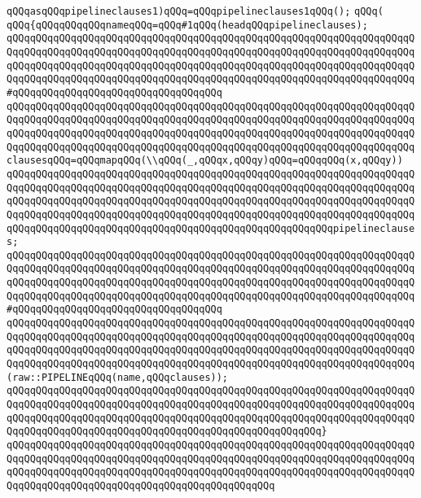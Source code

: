 \verb|qQQqasqQQqpipelineclauses1)qQQq=qQQqpipelineclauses1qQQq();|\newline
\verb|qQQq(|\newline
\verb|qQQq{qQQqqQQqqQQqnameqQQq=qQQq#1qQQq(headqQQqpipelineclauses);|\newline
\verb|qQQqqQQqqQQqqQQqqQQqqQQqqQQqqQQqqQQqqQQqqQQqqQQqqQQqqQQqqQQqqQQqqQQqqQQqqQQqqQQqqQQqqQQqqQQqqQQqqQQqqQQqqQQqqQQqqQQqqQQqqQQqqQQqqQQqqQQqqQQqqQQqqQQqqQQqqQQqqQQqqQQqqQQqqQQqqQQqqQQqqQQqqQQqqQQqqQQqqQQqqQQqqQQqqQQqqQQqqQQqqQQqqQQqqQQqqQQqqQQqqQQqqQQqqQQqqQQqqQQqqQQqqQQqqQQqqQQqqQQq#qQQqqQQqqQQqqQQqqQQqqQQqqQQqqQQqqQQq|\newline
\verb|qQQqqQQqqQQqqQQqqQQqqQQqqQQqqQQqqQQqqQQqqQQqqQQqqQQqqQQqqQQqqQQqqQQqqQQqqQQqqQQqqQQqqQQqqQQqqQQqqQQqqQQqqQQqqQQqqQQqqQQqqQQqqQQqqQQqqQQqqQQqqQQqqQQqqQQqqQQqqQQqqQQqqQQqqQQqqQQqqQQqqQQqqQQqqQQqqQQqqQQqqQQqqQQqqQQqqQQqqQQqqQQqqQQqqQQqqQQqqQQqqQQqqQQqqQQqqQQqqQQqqQQqqQQqqQQqqQQqqQQqclausesqQQq=qQQqmapqQQq(\\qQQq(_,qQQqx,qQQqy)qQQq=qQQqqQQq(x,qQQqy))|\newline
\verb|qQQqqQQqqQQqqQQqqQQqqQQqqQQqqQQqqQQqqQQqqQQqqQQqqQQqqQQqqQQqqQQqqQQqqQQqqQQqqQQqqQQqqQQqqQQqqQQqqQQqqQQqqQQqqQQqqQQqqQQqqQQqqQQqqQQqqQQqqQQqqQQqqQQqqQQqqQQqqQQqqQQqqQQqqQQqqQQqqQQqqQQqqQQqqQQqqQQqqQQqqQQqqQQqqQQqqQQqqQQqqQQqqQQqqQQqqQQqqQQqqQQqqQQqqQQqqQQqqQQqqQQqqQQqqQQqqQQqqQQqqQQqqQQqqQQqqQQqqQQqqQQqqQQqqQQqqQQqqQQqqQQqqQQqqQQqqQQqpipelineclauses;|\newline
\verb|qQQqqQQqqQQqqQQqqQQqqQQqqQQqqQQqqQQqqQQqqQQqqQQqqQQqqQQqqQQqqQQqqQQqqQQqqQQqqQQqqQQqqQQqqQQqqQQqqQQqqQQqqQQqqQQqqQQqqQQqqQQqqQQqqQQqqQQqqQQqqQQqqQQqqQQqqQQqqQQqqQQqqQQqqQQqqQQqqQQqqQQqqQQqqQQqqQQqqQQqqQQqqQQqqQQqqQQqqQQqqQQqqQQqqQQqqQQqqQQqqQQqqQQqqQQqqQQqqQQqqQQqqQQqqQQqqQQqqQQq#qQQqqQQqqQQqqQQqqQQqqQQqqQQqqQQqqQQq|\newline
\verb|qQQqqQQqqQQqqQQqqQQqqQQqqQQqqQQqqQQqqQQqqQQqqQQqqQQqqQQqqQQqqQQqqQQqqQQqqQQqqQQqqQQqqQQqqQQqqQQqqQQqqQQqqQQqqQQqqQQqqQQqqQQqqQQqqQQqqQQqqQQqqQQqqQQqqQQqqQQqqQQqqQQqqQQqqQQqqQQqqQQqqQQqqQQqqQQqqQQqqQQqqQQqqQQqqQQqqQQqqQQqqQQqqQQqqQQqqQQqqQQqqQQqqQQqqQQqqQQqqQQqqQQqqQQqqQQqqQQqqQQq(raw::PIPELINEqQQq(name,qQQqclauses));|\newline
\verb|qQQqqQQqqQQqqQQqqQQqqQQqqQQqqQQqqQQqqQQqqQQqqQQqqQQqqQQqqQQqqQQqqQQqqQQqqQQqqQQqqQQqqQQqqQQqqQQqqQQqqQQqqQQqqQQqqQQqqQQqqQQqqQQqqQQqqQQqqQQqqQQqqQQqqQQqqQQqqQQqqQQqqQQqqQQqqQQqqQQqqQQqqQQqqQQqqQQqqQQqqQQqqQQqqQQqqQQqqQQqqQQqqQQqqQQqqQQqqQQqqQQqqQQqqQQqqQQqqQQqqQQq}|\newline
\verb|qQQqqQQqqQQqqQQqqQQqqQQqqQQqqQQqqQQqqQQqqQQqqQQqqQQqqQQqqQQqqQQqqQQqqQQqqQQqqQQqqQQqqQQqqQQqqQQqqQQqqQQqqQQqqQQqqQQqqQQqqQQqqQQqqQQqqQQqqQQqqQQqqQQqqQQqqQQqqQQqqQQqqQQqqQQqqQQqqQQqqQQqqQQqqQQqqQQqqQQqqQQqqQQqqQQqqQQqqQQqqQQqqQQqqQQqqQQqqQQqqQQqqQQqqQQqqQQq|\newline
